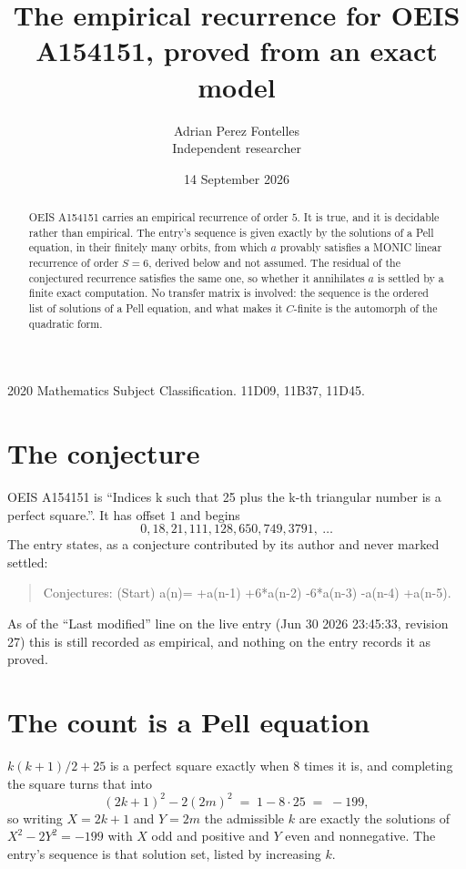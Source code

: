 \documentclass[11pt,a4paper]{article}
\title{The empirical recurrence for OEIS A154151, proved from an exact model}
\author{Adrian Perez Fontelles\\ \small Independent researcher}
\date{14 September 2026}
\theoremstyle{plain}
\theoremstyle{definition}
\begin{document}
\maketitle

\begin{abstract}
OEIS A154151 carries an empirical recurrence of order $5$. It is true, and it is
decidable rather than empirical. The entry's sequence is given exactly by the solutions of a Pell equation, in their finitely many orbits, from
which $a$ provably satisfies a MONIC linear recurrence of order $S=6$, derived below and not
assumed. The residual of the conjectured recurrence satisfies the same one, so whether it
annihilates $a$ is settled by a finite exact computation. No transfer matrix is involved: the sequence is the ordered list of solutions of a Pell equation, and what makes it $C$-finite is the automorph of the quadratic form.
\end{abstract}

\noindent\small 2020 Mathematics Subject Classification. 11D09, 11B37, 11D45.\normalsize

\section{The conjecture}

OEIS A154151 is ``Indices k such that 25 plus the k-th triangular number is a perfect square.''. It has offset $1$ and begins
\[
0, 18, 21, 111, 128, 650, 749, 3791,\ \dots
\]
The entry states, as a conjecture contributed by its author and never marked settled:
\begin{quote}
Conjectures: (Start) a(n)= +a(n-1) +6*a(n-2) -6*a(n-3) -a(n-4) +a(n-5).
\end{quote}
As of the ``Last modified'' line on the live entry (Jun 30 2026 23:45:33, revision 27)
this is still recorded as empirical, and nothing on the entry records it as proved.

\section{The count is a Pell equation}

$k(k+1)/2 + 25$ is a perfect square exactly when $8$ times it is, and completing the square
turns that into
\[
(2k+1)^2-2(2m)^2\;=\;1-8\cdot25\;=\;-199,
\]
so writing $X=2k+1$ and $Y=2m$ the admissible $k$ are exactly the solutions of $X^2-2Y^2=-199$
with $X$ odd and positive and $Y$ even and nonnegative. The entry's sequence is that solution
set, listed by increasing $k$.
\end{document}
